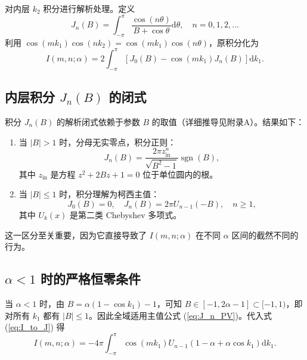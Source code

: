 \documentclass{article} %
\newcommand{\di}{\mathrm{d}}
\begin{document}
对内层 $k_2$ 积分进行解析处理。定义
\begin{equation}
    J_n(B) = \int_{-\pi}^{\pi} \frac{\cos(n\theta)}{B + \cos\theta} \di\theta, \quad n=0,1,2,\dots
    \label{eq:J_n_definition}
\end{equation}
利用 $\cos(mk_1)\cos(nk_2) = \cos(mk_1)\cos(n\theta)$，原积分化为
\begin{equation}
    I(m,n;\alpha) = 2\int_{-\pi}^{\pi} \left[J_0(B) - \cos(mk_1) J_n(B)\right] \di k_1.
    \label{eq:I_to_J}
\end{equation}

\subsection{内层积分 $J_n(B)$ 的闭式}

积分 $J_n(B)$ 的解析闭式依赖于参数 $B$ 的取值（详细推导见附录A）。结果如下：

\begin{enumerate}
    \item 当 $|B| > 1$ 时，分母无实零点，积分正则：
    \begin{equation}
        J_n(B) = \frac{2\pi z_{\text{in}}^n}{\sqrt{B^2-1}} \operatorname{sgn}(B),
        \label{eq:J_n_regular}
    \end{equation}
    其中 $z_{\text{in}}$ 是方程 $z^2+2Bz+1=0$ 位于单位圆内的根。
    \item 当 $|B| \le 1$ 时，积分理解为柯西主值：
    \begin{equation}
        J_0(B) = 0, \quad J_n(B) = 2\pi U_{n-1}(-B), \quad n\ge 1,
        \label{eq:J_n_PV}
    \end{equation}
    其中 $U_k(x)$ 是第二类 Chebyshev 多项式。
\end{enumerate}

这一区分至关重要，因为它直接导致了 $I(m,n;\alpha)$ 在不同 $\alpha$ 区间的截然不同的行为。

\subsection{$\alpha < 1$ 时的严格恒零条件}

当 $\alpha < 1$ 时，由 $B = \alpha(1-\cos k_1) - 1$，可知 $B \in [-1, 2\alpha-1] \subset [-1, 1)$，即对所有 $k_1$ 都有 $|B| \le 1$。因此全域适用主值公式 (\ref{eq:J_n_PV})。代入式 (\ref{eq:I_to_J}) 得
\begin{equation}
    I(m,n;\alpha) = -4\pi \int_{-\pi}^{\pi} \cos(mk_1) U_{n-1}(1-\alpha+\alpha\cos k_1) \di k_1.
    \label{eq:I_alpha_less_1}
\end{equation}
\end{document}
